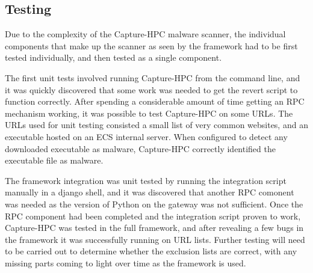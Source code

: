 \subsection{Testing}

Due to the complexity of the Capture-HPC malware scanner, the individual
components that make up the scanner as seen by the framework had to be first
tested individually, and then tested as a single component.

The first unit tests involved running Capture-HPC from the command line, and it
was quickly discovered that some work was needed to get the revert script to
function correctly. After spending a considerable amount of time getting an RPC
mechanism working, it was possible to test Capture-HPC on some URLs. The URLs
used for unit testing consisted a small list of very common websites, and an
executable hosted on an ECS internal server. When configured to detect any
downloaded executable as malware, Capture-HPC correctly identified the
executable file as malware.

The framework integration was unit tested by running the integration script
manually in a django shell, and it was discovered that another RPC comonent was
needed as the version of Python on the gateway was not sufficient. Once the RPC
component had been completed and the integration script proven to work,
Capture-HPC was tested in the full framework, and after revealing a few bugs in
the framework it was successfully running on URL lists. Further testing will
need to be carried out to determine whether the exclusion lists are correct,
with any missing parts coming to light over time as the framework is used.
